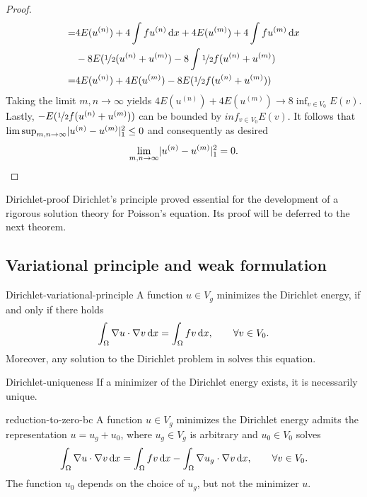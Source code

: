 \begin{proof}
\begin{align*}
    =& 4 E(u^{(n)}) + 4\int f u^{(n)} \,\mathrm{d} x + 4 E(u^{(m)}) + 4\int f u^{(m)} \,\mathrm{d} x \\
                                    &- 8 E(\nicefrac 12 (u^{(n)} + u^{(m)}) - 8 \int \nicefrac 12 f(u^{(n)} + u^{(m)}) \\
    =& 4 E(u^{(n)}) + 4 E(u^{(m)}) - 8 E(\nicefrac 12 f(u^{(n)} + u^{(m)}))
  \end{align*}
  Taking the limit $m,n\to \infty$ yields $4 E(u^{(n)}) + 4 E(u^{(m)})
  \to 8 \inf_{v \in V_0} E(v)$. Lastly, $-E(\nicefrac 12 f(u^{(n)} + u^{(m)}))$ can
  be bounded by $inf_{v \in V_0} E(v)$. It follows that $\limsup_{m,n\to\infty}
  \lvert u^{(n)}-u^{(m)}\rvert^2_1 \le 0$ and consequently as desired
  \begin{gather*}
    \lim_{m,n\to\infty} \lvert u^{(n)}-u^{(m)}\rvert^2_1 = 0.
  \end{gather*}    
\end{proof}

\begin{notes}{Dirichlet-proof}
  Dirichlet's principle proved essential for the development of a
  rigorous solution theory for Poisson's equation.  Its proof will be
  deferred to the next theorem.
\end{notes}

\subsection{Variational principle and weak formulation}
\begin{Theorem}{Dirichlet-variational-principle}
  A function $u\in V_g$ minimizes the Dirichlet energy, if and only if
  there holds
  \begin{gather}
    \int_{\Omega} \nabla u\cdot\nabla v \,\mathrm{d} x
    = \int_{\Omega} fv\,\mathrm{d} x, \qquad\forall v\in V_0.
  \end{gather}
  Moreover, any solution to the Dirichlet problem in
   solves this
  equation.
\end{Theorem}

\begin{Corollary}{Dirichlet-uniqueness}
  If a minimizer of the Dirichlet energy exists, it is necessarily unique.
\end{Corollary}

\begin{Lemma}{reduction-to-zero-bc}
  A function $u\in V_g$ minimizes the Dirichlet energy admits the
  representation $u = u_g + u_0$, where $u_g\in V_g$ is arbitrary and
  $u_0\in V_0$ solves
  \begin{gather}
    \int_{\Omega} \nabla u\cdot\nabla v \,\mathrm{d} x
    = \int_{\Omega} fv\,\mathrm{d} x
    - \int_{\Omega} \nabla u_g\cdot\nabla v \,\mathrm{d} x,
    \qquad\forall v\in V_0.
  \end{gather}
  The function $u_0$ depends on the choice of $u_g$, but not the minimizer $u$.
\end{Lemma}

